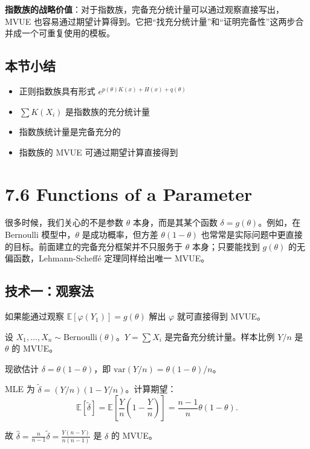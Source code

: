 \textbf{指数族的战略价值}：对于指数族，完备充分统计量可以通过观察直接写出，MVUE 也容易通过期望计算得到。它把``找充分统计量''和``证明完备性''这两步合并成一个可重复使用的模板。

\subsection*{本节小结}

\begin{itemize}
\item 正则指数族具有形式 $e^{p(\theta)K(x) + H(x) + q(\theta)}$
\item $\sum K(X_i)$ 是指数族的充分统计量
\item 指数族统计量是完备充分的
\item 指数族的 MVUE 可通过期望计算直接得到
\end{itemize}

\section{7.6 Functions of a Parameter}\label{sec:7.6}

很多时候，我们关心的不是参数 $\theta$ 本身，而是其某个函数 $\delta = g(\theta)$。例如，在 Bernoulli 模型中，$\theta$ 是成功概率，但方差 $\theta(1-\theta)$ 也常常是实际问题中更直接的目标。前面建立的完备充分框架并不只服务于 $\theta$ 本身；只要能找到 $g(\theta)$ 的无偏函数，Lehmann-Scheffé 定理同样给出唯一 MVUE。

\subsection{技术一：观察法}

如果能通过观察 $\mathbb{E}[\varphi(Y_1)] = g(\theta)$ 解出 $\varphi$ 就可直接得到 MVUE。

\begin{example}\label{ex:binomial-variance-mvue}
设 $X_1, \ldots, X_n \sim \text{Bernoulli}(\theta)$。$Y = \sum X_i$ 是完备充分统计量。样本比例 $Y/n$ 是 $\theta$ 的 MVUE。

现欲估计 $\delta = \theta(1-\theta)$，即 $\text{var}(Y/n) = \theta(1-\theta)/n$。

MLE 为 $\tilde{\delta} = (Y/n)(1 - Y/n)$。计算期望：
\[
\mathbb{E}[\tilde{\delta}] = \mathbb{E}\left[\frac{Y}{n}\left(1 - \frac{Y}{n}\right)\right] = \frac{n-1}{n}\theta(1-\theta).
\]

故 $\hat{\delta} = \frac{n}{n-1}\tilde{\delta} = \frac{Y(n-Y)}{n(n-1)}$ 是 $\delta$ 的 MVUE。
\end{example}

